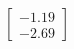 \documentclass[preview]{standalone}
\begin{document}
\begin{align*}
\begin{bmatrix} -1.19 \\ -2.69 \end{bmatrix}
\end{align*}
\end{document}
